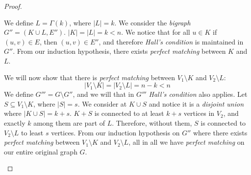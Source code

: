 \documentclass[00_complete]{subfiles}
\begin{document}
\begin{proof}
\begin{enumerate}
\begin{enumerate}[I.]
\begin{enumerate}[a.]
                        We define $L=\Gamma(k)$, where $|L|=k$. We consider
                        the \emph{bigraph} $G''=(K\cup L,E'')$. $|K|=|L|=k<n$.
                        We notice that for all $u \in K$ if $(u,v) \in E$, then
                        $(u,v) \in E''$, and therefore \emph{Hall's condition}
                        is maintained in $G''$. From our induction hypothesis,
                        there exists \emph{perfect matching} between $K$ and
                        $L$.

                        We will now show that there is \emph{perfect matching}
                        between $V_1 \setminus K$ and $V_2\setminus L$:
                        $$|V_1\setminus K| = |V_2\setminus L|=n-k<n$$
                        We define $G'''=G\setminus G''$, and we will that in
                        $G'''$ \emph{Hall's condition} also applies.
                        Let $S \subseteq V_1 \setminus K$, where $|S|=s$. We
                        consider at $K\cup S$ and notice it is a \emph{disjoint
                        union} where $|K \cup S|=k+s$. $K+S$ is connected to at
                        least $k+s$ vertices in $V_2$, and exactly $k$ among
                        them are part of $L$. Therefore, without them, $S$ is
                        connected to $V_2 \setminus L$ to least $s$ vertices.
                        From our induction hypothesis on $G''$ where there
                        exists \emph{perfect matching} between $V_1 \setminus
                        K$ and $V_2 \setminus L$, all in all we have
                        \emph{perfect matching} on our entire original graph
                        $G$.
                    \end{enumerate}
            \end{enumerate}
    \end{enumerate}
\end{proof}
\end{document}

